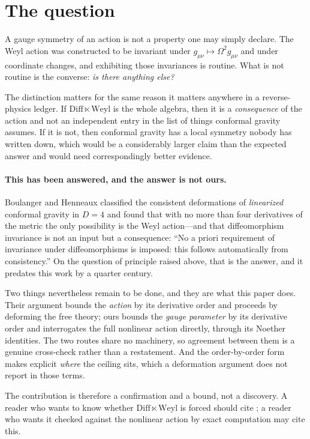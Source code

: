 \documentclass[11pt]{article}
\theoremstyle{definition}
\theoremstyle{remark}
\begin{document}
\section{The question}
\label{sec:question}

A gauge symmetry of an action is not a property one may simply declare.  The
Weyl action was constructed to be invariant under
\(g_{\mu\nu}\mapsto\Omega^{2}g_{\mu\nu}\) and under coordinate changes, and
exhibiting those invariances is routine.  What is not routine is the converse:
\emph{is there anything else?}

The distinction matters for the same reason it matters anywhere in a
reverse-physics ledger.  If \(\mathrm{Diff}\ltimes\mathrm{Weyl}\) is the whole
algebra, then it is a \emph{consequence} of the action and not an independent
entry in the list of things conformal gravity assumes.  If it is not, then
conformal gravity has a local symmetry nobody has written down, which would be
a considerably larger claim than the expected answer and would need
correspondingly better evidence.

\paragraph{This has been answered, and the answer is not ours.}
Boulanger and Henneaux \cite{BoulangerHenneaux2001} classified the consistent
deformations of \emph{linearized} conformal gravity in \(D=4\) and found that
with no more than four derivatives of the metric the only possibility is the
Weyl action---and that diffeomorphism invariance is not an input but a
consequence: ``No a priori requirement of invariance under diffeomorphisms is
imposed: this follows automatically from consistency.''  On the question of
principle raised above, that is the answer, and it predates this work by a
quarter century.

Two things nevertheless remain to be done, and they are what this paper does.
Their argument bounds the \emph{action} by its derivative order and proceeds
by deforming the free theory; ours bounds the \emph{gauge parameter} by its
derivative order and interrogates the full nonlinear action directly, through
its Noether identities.  The two routes share no machinery, so agreement
between them is a genuine cross-check rather than a restatement.  And the
order-by-order form makes explicit \emph{where} the ceiling sits, which a
deformation argument does not report in those terms.

The contribution is therefore a confirmation and a bound, not a discovery.  A
reader who wants to know whether \(\mathrm{Diff}\ltimes\mathrm{Weyl}\) is
forced should cite \cite{BoulangerHenneaux2001}; a reader who wants it checked
against the nonlinear action by exact computation may cite this.
\end{document}
